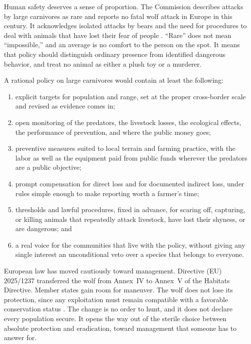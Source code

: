\documentclass[12pt,a4paper]{book}
\begin{document}
Human safety deserves a sense of proportion. The Commission describes attacks by large carnivores as rare and reports no fatal wolf attack in Europe in this century. It acknowledges isolated attacks by bears and the need for procedures to deal with animals that have lost their fear of people \cite{ECLargeCarnivoreFacts2026}. ``Rare'' does not mean ``impossible,'' and an average is no comfort to the person on the spot. It means that policy should distinguish ordinary presence from identified dangerous behavior, and treat no animal as either a plush toy or a murderer.

A rational policy on large carnivores would contain at least the following:

\begin{enumerate}
\item explicit targets for population and range, set at the proper cross-border scale and revised as evidence comes in;

\item open monitoring of the predators, the livestock losses, the ecological effects, the performance of prevention, and where the public money goes;

\item preventive measures suited to local terrain and farming practice, with the labor as well as the equipment paid from public funds wherever the predators are a public objective;

\item prompt compensation for direct loss and for documented indirect loss, under rules simple enough to make reporting worth a farmer's time;

\item thresholds and lawful procedures, fixed in advance, for scaring off, capturing, or killing animals that repeatedly attack livestock, have lost their shyness, or are dangerous; and

\item a real voice for the communities that live with the policy, without giving any single interest an unconditional veto over a species that belongs to everyone.
\end{enumerate}

European law has moved cautiously toward management. Directive (EU) 2025/1237 transferred the wolf from Annex~IV to Annex~V of the Habitats Directive. Member states gain room for maneuver. The wolf does not lose its protection, since any exploitation must remain compatible with a favorable conservation status \cite{EUWolfProtectionDirective2025}. The change is no order to hunt, and it does not declare every population secure. It opens the way out of the sterile choice between absolute protection and eradication, toward management that someone has to answer for.
\end{document}
